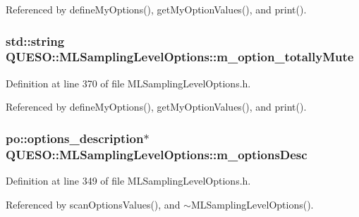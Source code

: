 Referenced by define\-My\-Options(), get\-My\-Option\-Values(), and print().

\hypertarget{class_q_u_e_s_o_1_1_m_l_sampling_level_options_a303f13a4f8fe1fb586ada0b95c0c2f8c}{
\subsubsection[{m\-\_\-option\-\_\-totally\-Mute}]{\setlength{\rightskip}{0pt plus 5cm}std\-::string Q\-U\-E\-S\-O\-::\-M\-L\-Sampling\-Level\-Options\-::m\-\_\-option\-\_\-totally\-Mute\hspace{0.3cm}{\ttfamily [private]}}}\label{class_q_u_e_s_o_1_1_m_l_sampling_level_options_a303f13a4f8fe1fb586ada0b95c0c2f8c}


Definition at line 370 of file M\-L\-Sampling\-Level\-Options.\-h.



Referenced by define\-My\-Options(), get\-My\-Option\-Values(), and print().

\hypertarget{class_q_u_e_s_o_1_1_m_l_sampling_level_options_a7a3b7a94c7ae6a592f1744f19c74e2a2}{
\subsubsection[{m\-\_\-options\-Desc}]{\setlength{\rightskip}{0pt plus 5cm}po\-::options\-\_\-description$\ast$ Q\-U\-E\-S\-O\-::\-M\-L\-Sampling\-Level\-Options\-::m\-\_\-options\-Desc\hspace{0.3cm}{\ttfamily [private]}}}\label{class_q_u_e_s_o_1_1_m_l_sampling_level_options_a7a3b7a94c7ae6a592f1744f19c74e2a2}


Definition at line 349 of file M\-L\-Sampling\-Level\-Options.\-h.



Referenced by scan\-Options\-Values(), and $\sim$\-M\-L\-Sampling\-Level\-Options().

